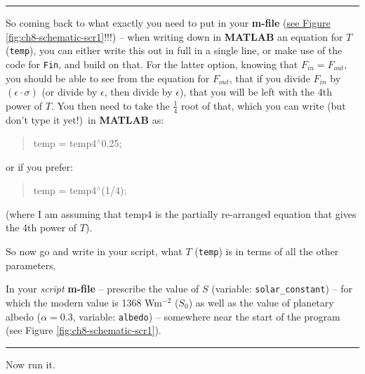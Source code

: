 \documentclass{tufte-book} %
\newenvironment{docspec}{\begin{quotation}\ttfamily\parskip0pt\parindent0pt\ignorespaces}{\end{quotation}}
\begin{document}
\vspace{1mm}
\noindent\rule{4cm}{0.5pt}
\vspace{2mm}

\noindent So coming back to what exactly you need to put in your \textbf{m-file} (\uline{see Figure \ref{fig:ch8-schematic-scr1}}!!!) -- when writing down in \textbf{MATLAB} an equation for \(T\) (\texttt{temp}), you can either write this out in full in a single line, or make use of the code for \texttt{Fin}, and build on that. For the latter option, knowing that \(F_{in} = F_{out}\), you should be able to see from the equation for \(F_{out}\), that if you divide \(F_{in}\) by \(\left(\epsilon\cdot\sigma\right)\) (or divide by \(\epsilon\), then divide by \(\epsilon\)), that you will be left with the 4th power of \(T\). You then need to take the \(\frac{1}{4}\) root of that, which you can write (but don't type it yet!)\ in \textbf{MATLAB} as:
\begin{docspec}
temp = temp4\(^{\wedge}\)0.25;
\end{docspec}
or if you prefer:
\begin{docspec}
temp = temp4\(^{\wedge}\)(1/4);
\end{docspec}
(where I am assuming that temp4 is the partially re-arranged equation that gives the 4th power of \(T\)).

So now go and write in your script, what \(T\) (\texttt{temp}) is in terms of all the other parameters.

In your \textit{script} \textbf{m-file} -- prescribe the value of \(S\) (variable: \texttt{solar\_constant}) -- for which the modern value is 1368 Wm\(^{-2}\) (\(S_{0}\)) as well as the value of planetary albedo (\(\alpha=0.3\), variable: \texttt{albedo}) -- somewhere near the start of the program (see Figure \ref{fig:ch8-schematic-scr1}).

\vspace{1mm}
\noindent\rule{4cm}{0.5pt}
\vspace{2mm}

\noindent Now run it.
\vspace{1mm}
\end{document}
